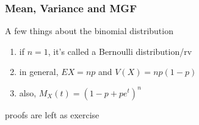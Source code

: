 \documentclass{beamer}
\begin{document}

\begin{frame}
\frametitle{Mean, Variance and MGF}

A few things about the binomial distribution
\begin{enumerate}
\item if $n=1$, it's called a Bernoulli distribution/rv
\item in general, $EX = np$ and $V(X) = np(1-p)$
\item also, $M_X(t) = (1 - p + pe^t)^n$
\end{enumerate}

proofs are left as exercise

\end{frame}

\end{document}
